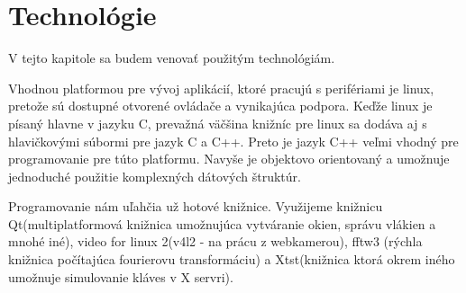 \chapter{Technológie}\label{chap:tech}

V tejto kapitole sa budem venovať použitým technológiám.
\bigskip

Vhodnou platformou pre vývoj aplikácií, ktoré pracujú s perifériami je linux, pretože sú dostupné otvorené ovládače a vynikajúca podpora.
Keďže linux je písaný hlavne v jazyku C, prevažná väčšina knižníc pre linux sa dodáva aj s hlavičkovými súbormi pre jazyk C a C++.
Preto je jazyk C++ veľmi vhodný pre programovanie pre túto platformu. Navyše je objektovo orientovaný a umožnuje jednoduché použitie komplexných dátových štruktúr.

Programovanie nám uľahčia už hotové knižnice. Využijeme knižnicu Qt(multiplatformová knižnica umožnujúca vytváranie okien, správu vlákien a mnohé iné),
video for linux 2(v4l2 - na prácu z webkamerou), fftw3 (rýchla knižnica počítajúca fourierovu transformáciu) a Xtst(knižnica ktorá okrem iného umožnuje simulovanie kláves v X servri).
